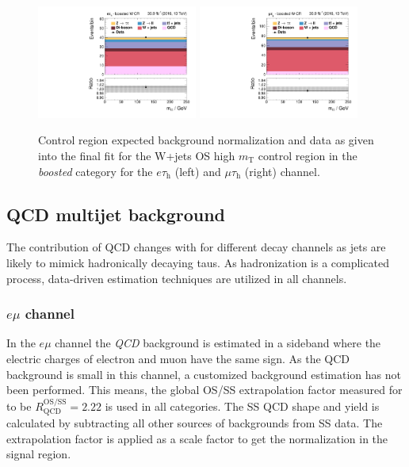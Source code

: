\begin{figure}[h!]
    \centering
    \includegraphics[width=0.47\textwidth]{Figures/background_estimation/qcd_et_control-regions/htt_inputet13__htt_et_13_13TeV.pdf}
    \includegraphics[width=0.47\textwidth]{Figures/background_estimation/qcd_mt_control-regions/htt_inputmt13__htt_mt_13_13TeV.pdf}
 \caption[\textit{Boosted} opposite-sign \textit{W+jets} control regions.]{Control region expected background normalization and data as given into the final fit for the W+jets OS high $m_\text{T}$ control region in the \textit{boosted} category for the $e\tau_\text{h}$ (left) and $\mu\tau_\text{h}$ (right) channel.}\label{fig:etmtqcd:0jet_w_ss_control}
\end{figure}

\clearpage

\subsection{QCD multijet background\label{sec:BackgroundEstimations:QCD}}

The contribution of QCD changes with for different decay channels as jets are likely to mimick hadronically decaying taus. As hadronization
is a complicated process, data-driven estimation techniques are utilized in all channels.

\subsubsection{$e\mu$ channel}

In the $e\mu$ channel the \textit{QCD} background is estimated in a sideband where the electric charges of electron and muon have the same sign.
As the QCD background is small in this channel, a customized background estimation has not been performed.
This means, the global OS/SS extrapolation factor measured for \cite{Sirunyan:2017khh} to be $R_\text{QCD}^\text{OS/SS}=2.22$ is used in all categories.
The SS QCD shape and yield is calculated by subtracting all other sources of backgrounds from SS data. The extrapolation factor is applied as a scale factor to get
the normalization in the signal region.

